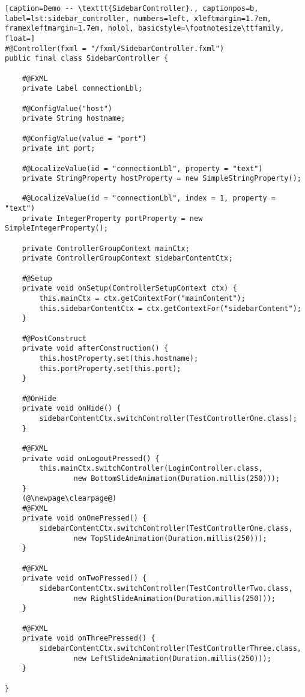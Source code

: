 	\begin{lstlisting}[caption=Demo -- \texttt{SidebarController}., captionpos=b, label=lst:sidebar_controller, numbers=left, xleftmargin=1.7em, framexleftmargin=1.7em, nolol, basicstyle=\footnotesize\ttfamily, float=]
#@Controller(fxml = "/fxml/SidebarController.fxml")
public final class SidebarController {

    #@FXML
    private Label connectionLbl;

    #@ConfigValue("host")
    private String hostname;

    #@ConfigValue(value = "port")
    private int port;

    #@LocalizeValue(id = "connectionLbl", property = "text")
    private StringProperty hostProperty = new SimpleStringProperty();

    #@LocalizeValue(id = "connectionLbl", index = 1, property = "text")
    private IntegerProperty portProperty = new SimpleIntegerProperty();

    private ControllerGroupContext mainCtx;
    private ControllerGroupContext sidebarContentCtx;

    #@Setup
    private void onSetup(ControllerSetupContext ctx) {
        this.mainCtx = ctx.getContextFor("mainContent");
        this.sidebarContentCtx = ctx.getContextFor("sidebarContent");
    }

    #@PostConstruct
    private void afterConstruction() {
        this.hostProperty.set(this.hostname);
        this.portProperty.set(this.port);
    }

    #@OnHide
    private void onHide() {
        sidebarContentCtx.switchController(TestControllerOne.class);
    }

    #@FXML
    private void onLogoutPressed() {
        this.mainCtx.switchController(LoginController.class, 
				new BottomSlideAnimation(Duration.millis(250)));
    }
	(@\newpage\clearpage@)
    #@FXML
    private void onOnePressed() {
        sidebarContentCtx.switchController(TestControllerOne.class, 
				new TopSlideAnimation(Duration.millis(250)));
    }

    #@FXML
    private void onTwoPressed() {
        sidebarContentCtx.switchController(TestControllerTwo.class,
				new RightSlideAnimation(Duration.millis(250)));
    }

    #@FXML
    private void onThreePressed() {
        sidebarContentCtx.switchController(TestControllerThree.class, 
				new LeftSlideAnimation(Duration.millis(250)));
    }

}
	\end{lstlisting}
